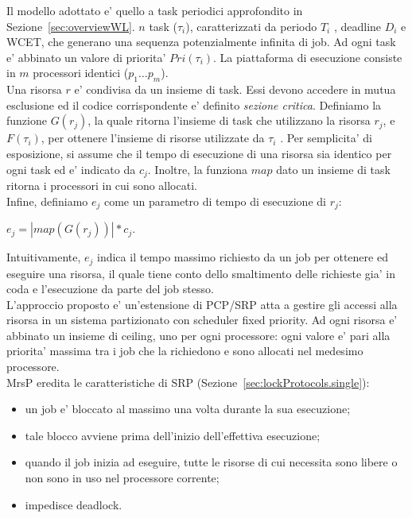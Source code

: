 Il modello adottato e’ quello a task periodici approfondito in Sezione~\ref{sec:overviewWL}. $n$ task ($\tau_i$), caratterizzati da periodo $T_i$ , deadline $D_i$ e WCET, che generano una sequenza potenzialmente infinita di job. Ad ogni task e’ abbinato un valore di priorita’ $Pri(\tau_i)$. La piattaforma di esecuzione consiste in $m$ processori identici ($p_1 … p_m$).\\
Una risorsa $r$ e’ condivisa da un insieme di task. Essi devono accedere in mutua esclusione ed il codice corrispondente e’ definito \textit{sezione critica}. Definiamo la funzione $G(r_j)$, la quale ritorna l’insieme di task che utilizzano la risorsa $r_j$, e $F(\tau_i)$, per ottenere l’insieme di risorse utilizzate da $\tau_i$ . Per semplicita’ di esposizione, si assume che il tempo di esecuzione di una risorsa sia identico per ogni task ed e’ indicato da $c_j$. Inoltre, la funziona $map$ dato un insieme di task ritorna i processori in cui sono allocati.\\
Infine, definiamo $e_j$ come un parametro di tempo di esecuzione di $r_j$:\\

\centerline{$e_j = | map(G(r_j)) | * c_j$.}

Intuitivamente, $e_j$ indica il tempo massimo richiesto da un job per ottenere ed eseguire una risorsa, il quale tiene conto dello smaltimento delle richieste gia’ in coda e l’esecuzione da parte del job stesso.\\

L’approccio proposto e’ un’estensione di PCP/SRP atta a gestire gli accessi alla risorsa in un sistema partizionato con scheduler fixed priority. Ad ogni risorsa e' abbinato un insieme di ceiling, uno per ogni processore: ogni valore e' pari alla priorita' massima tra i job che la richiedono e sono allocati nel medesimo processore.\\
MrsP eredita le caratteristiche di SRP (Sezione~\ref{sec:lockProtocols.single}):

\begin{itemize}
\item un job e’ bloccato al massimo una volta durante la sua esecuzione;
\item tale blocco avviene prima dell’inizio dell’effettiva esecuzione;
\item quando il job inizia ad eseguire, tutte le risorse di cui necessita sono libere o non sono in uso nel processore corrente;
\item impedisce deadlock.
\end{itemize}

